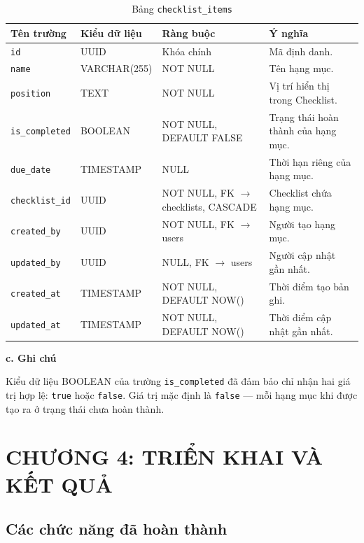 \begin{table}[H]
\centering
\begin{tabular}{|p{3cm}|p{3.5cm}|p{3.5cm}|p{4cm}|}
\hline
\textbf{Tên trường} & \textbf{Kiểu dữ liệu} & \textbf{Ràng buộc} & \textbf{Ý nghĩa} \\
\hline
\texttt{id} & UUID & Khóa chính & Mã định danh. \\
\hline
\texttt{name} & VARCHAR(255) & NOT NULL & Tên hạng mục. \\
\hline
\texttt{position} & TEXT & NOT NULL & Vị trí hiển thị trong Checklist. \\
\hline
\texttt{is\_completed} & BOOLEAN & NOT NULL, DEFAULT FALSE & Trạng thái hoàn thành của hạng mục. \\
\hline
\texttt{due\_date} & TIMESTAMP & NULL & Thời hạn riêng của hạng mục. \\
\hline
\texttt{checklist\_id} & UUID & NOT NULL, FK $\rightarrow$ checklists, CASCADE & Checklist chứa hạng mục. \\
\hline
\texttt{created\_by} & UUID & NOT NULL, FK $\rightarrow$ users & Người tạo hạng mục. \\
\hline
\texttt{updated\_by} & UUID & NULL, FK $\rightarrow$ users & Người cập nhật gần nhất. \\
\hline
\texttt{created\_at} & TIMESTAMP & NOT NULL, DEFAULT NOW() & Thời điểm tạo bản ghi. \\
\hline
\texttt{updated\_at} & TIMESTAMP & NOT NULL, DEFAULT NOW() & Thời điểm cập nhật gần nhất. \\
\hline
\end{tabular}
\caption{Bảng \texttt{checklist\_items}}
\label{tab:db_checklist_items}
\end{table}

\hspace{1.5em}\textbf{c. Ghi chú}

Kiểu dữ liệu BOOLEAN của trường \texttt{is\_completed} đã đảm bảo chỉ nhận hai giá trị hợp lệ: \texttt{true} hoặc \texttt{false}. Giá trị mặc định là \texttt{false} — mỗi hạng mục khi được tạo ra ở trạng thái chưa hoàn thành.


\clearpage

\section{CHƯƠNG 4: TRIỂN KHAI VÀ KẾT QUẢ}

\subsection{Các chức năng đã hoàn thành}

